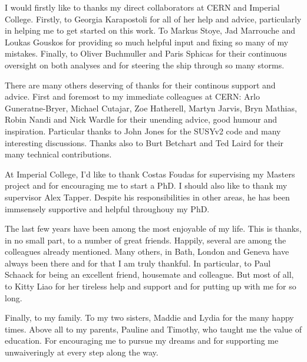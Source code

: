 \begin{acknowledgements}
  I would firstly like to thanks my direct collaborators at \ac{CERN} and
  Imperial College. Firstly, to Georgia Karapostoli for all of her help and
  advice, particularly in helping me to get started on this work. To Markus
  Stoye, Jad Marrouche and Loukas Gouskos for providing so much helpful input
  and fixing so many of my mistakes. Finally, to Oliver Buchmuller and Paris
  Sphicas for their continuous oversight on both analyses and for steering the
  ship through so many storms.

  There are many others deserving of thanks for their continous support and
  advice. First and foremost to my immediate colleagues at \ac{CERN}: Arlo
  Guneratne-Bryer, Michael Cutajar, Zoe Hatherell, Martyn Jarvis, Bryn Mathias,
  Robin Nandi and Nick Wardle for their unending advice, good humour and
  inspiration. Particular thanks to John Jones for the \ac{SUSYv2} code and many
  interesting discussions. Thanks also to Burt Betchart and Ted Laird for their
  many technical contributions.

  At Imperial College, I'd like to thank Costas Foudas for supervising my
  Masters project and for encouraging me to start a PhD.  I should also like to
  thank my supervisor Alex Tapper. Despite his responsibilities in other areas,
  he has been immsensely supportive and helpful throughouy my PhD.

  The last few years have been among the most enjoyable of my life. This is
  thanks, in no small part, to a number of great friends. Happily, several are
  among the colleagues already mentioned. Many others, in Bath, London and
  Geneva have always been there and for that I am truly thankful. In particular,
  to Paul Schaack for being an excellent friend, housemate and colleague. But
  most of all, to Kitty Liao for her tireless help and support and for putting
  up with me for so long.

  Finally, to my family.  To my two sisters, Maddie and Lydia for the many happy
  times. Above all to my parents, Pauline and Timothy, who taught me the value
  of education. For encouraging me to pursue my dreams and for supporting me
  unwaiveringly at every step along the way.
\end{acknowledgements}




\tableofcontents

\listoffigures
\listoftables

